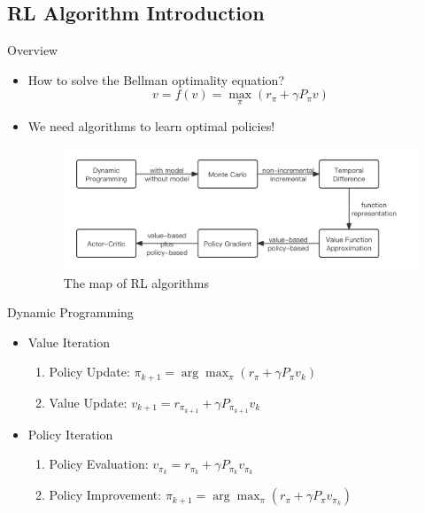 \documentclass[UTF8, 10pt]{beamer}
\begin{document}
\begin{CJK*}{UTF8}{gbsn}
\section{RL Algorithm Introduction}
\begin{frame}{Overview}
	\begin{itemize}
		\item How to solve the Bellman optimality equation?
			$$
			v=f(v)=\max _{\pi}\left(r_{\pi}+\gamma P_{\pi} v\right)
			$$
		\item We need algorithms to learn optimal policies!
			\begin{figure}[htpb]
		  		\begin{center}
		    	\includegraphics[width=0.9 \linewidth]
		    	{pic/overview.png}
		    	\caption{The map of RL algorithms}
		  		\end{center}
			\end{figure}
	\end{itemize}
\end{frame}
\begin{frame}{Dynamic Programming}
	\begin{itemize}
		\item Value Iteration
			\begin{enumerate}
				\item Policy Update:
					$
					\pi_{k+1}=\arg \max _{\pi}\left(r_{\pi}+\gamma P_{\pi} v_{k}\right)
					$
				\item Value Update:
					$
					v_{k+1}=r_{\pi_{k+1}}+\gamma P_{\pi_{k+1}} v_{k}
					$
			\end{enumerate}
		\item Policy Iteration
			\begin{enumerate}
				\item Policy Evaluation:
					$
					v_{\pi_{k}}=r_{\pi_{k}}+\gamma P_{\pi_{k}} v_{\pi_{k}}
					$
				\item Policy Improvement:
					$
					\pi_{k+1}=\arg \max _{\pi}\left(r_{\pi}+\gamma P_{\pi} v_{\pi_{k}}\right)
					$
			\end{enumerate}
	\end{itemize}
	

\end{frame}
\end{CJK*}
\end{document}
